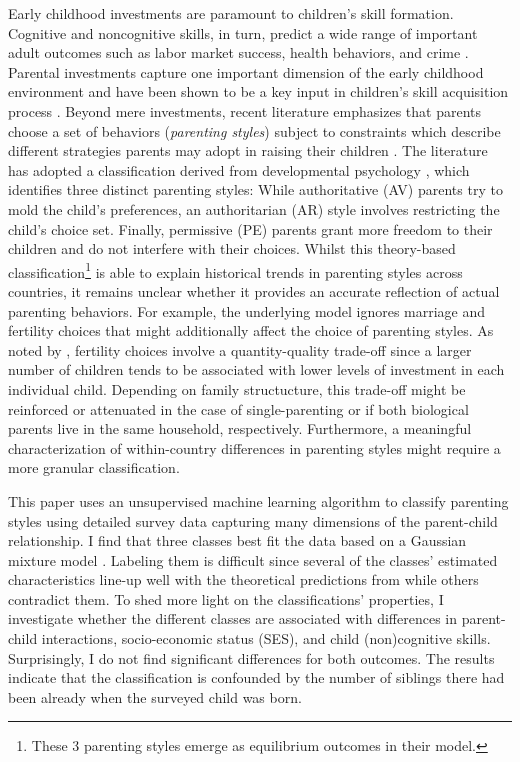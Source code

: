 Early childhood investments are paramount to children's skill formation. Cognitive and noncognitive skills, in turn, predict a wide range of important adult outcomes such as labor market success, health behaviors, and crime \parencites[e.g.][]{heckmanEffectsCognitiveNoncognitive2006}{almlundPersonalityPsychologyEconomics2011}. Parental investments capture one important dimension of the early childhood environment and have been shown to be a key input in children's skill acquisition process \parencites[e.g.][]{falkSocioEconomicStatusInequalities2021}{attanasioEstimatingProductionFunction2020}. Beyond mere investments, recent literature emphasizes that parents choose a set of behaviors (\textit{parenting styles}) subject to constraints which describe different strategies parents may adopt in raising their children \parencites{doepkeParentingStyleAltruism2017}{doepkeEconomicsParenting2019}. The literature has adopted a classification derived from developmental psychology \parencite{baumrindChildCarePractices1967}, which identifies three distinct parenting styles: While authoritative (AV) parents try to mold the child's preferences, an authoritarian (AR) style involves restricting the child's choice set. Finally, permissive (PE) parents grant more freedom to their children and do not interfere with their choices. Whilst this theory-based classification\footnote{These 3 parenting styles emerge as equilibrium outcomes in their model.} is able to explain historical trends in parenting styles across countries, it remains unclear whether it provides an accurate reflection of actual parenting behaviors. For example, the underlying model ignores marriage and fertility choices that might additionally affect the choice of parenting styles. As noted by \textcite{beckerTreatiseFamily1981}, fertility choices involve a quantity-quality trade-off since a larger number of children tends to be associated with 
lower levels of investment in each individual child. Depending on family structucture, this trade-off might be reinforced or attenuated in the case of single-parenting or if both biological parents live in the same household, respectively. Furthermore, a meaningful characterization of within-country differences in parenting styles might require a more granular classification.

This paper uses an unsupervised machine learning algorithm to classify parenting styles using detailed survey data capturing many dimensions of the parent-child relationship. I find that three classes best fit the data based on a Gaussian mixture model \parencite[e.g.][]{hastieElementsStatisticalLearning2009}. Labeling them is difficult since several of the classes' estimated characteristics line-up well with the theoretical predictions from \textcite{doepkeEconomicsParenting2019} while others contradict them. To shed more light on the classifications' properties, I investigate whether the different classes are associated with differences in parent-child interactions, socio-economic status (SES), and child (non)cognitive skills. Surprisingly, I do not find significant differences for both outcomes. The results indicate that the classification is confounded by the number of siblings there had been already when the surveyed child was born.

